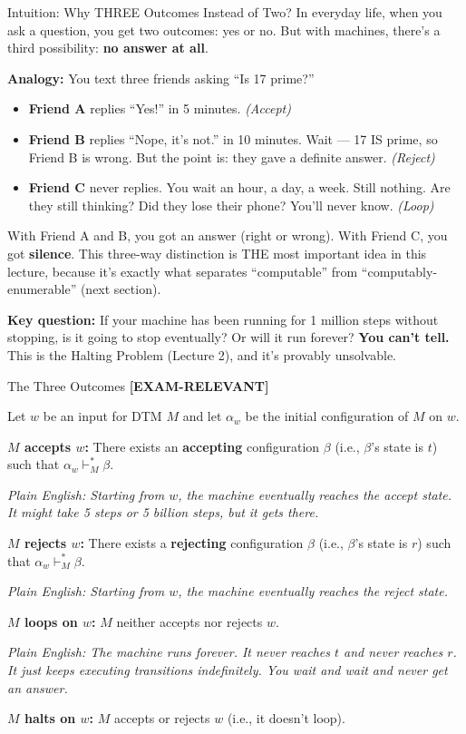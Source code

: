 \documentclass[11pt,a4paper]{article}
\newcommand{\kemark}{\textcolor{red!70!black}{\textbf{[EXAM-RELEVANT]}}}
\begin{document}
\begin{conceptbox}{Intuition: Why THREE Outcomes Instead of Two?}
In everyday life, when you ask a question, you get two outcomes: yes or no. But with machines, there's a third possibility: \textbf{no answer at all}.

\textbf{Analogy:} You text three friends asking ``Is 17 prime?''
\begin{itemize}[nosep]
\item \textbf{Friend A} replies ``Yes!'' in 5 minutes. \textit{(Accept)}
\item \textbf{Friend B} replies ``Nope, it's not.'' in 10 minutes. Wait --- 17 IS prime, so Friend B is wrong. But the point is: they gave a definite answer. \textit{(Reject)}
\item \textbf{Friend C} never replies. You wait an hour, a day, a week. Still nothing. Are they still thinking? Did they lose their phone? You'll never know. \textit{(Loop)}
\end{itemize}

With Friend A and B, you got an answer (right or wrong). With Friend C, you got \textbf{silence}. This three-way distinction is THE most important idea in this lecture, because it's exactly what separates ``computable'' from ``computably-enumerable'' (next section).

\textbf{Key question:} If your machine has been running for 1 million steps without stopping, is it going to stop eventually? Or will it run forever? \textbf{You can't tell.} This is the Halting Problem (Lecture 2), and it's provably unsolvable.
\end{conceptbox}

\begin{definitionbox}{{The Three Outcomes \kemark}}

Let $w$ be an input for DTM $M$ and let $\alpha_w$ be the initial configuration of $M$ on $w$.

\textbf{$M$ accepts $w$:} There exists an \textbf{accepting} configuration $\beta$ (i.e., $\beta$'s state is $t$) such that $\alpha_w \vdash_M^* \beta$.

\textit{Plain English: Starting from $w$, the machine eventually reaches the accept state. It might take 5 steps or 5 billion steps, but it gets there.}

\vspace{0.5em}
\textbf{$M$ rejects $w$:} There exists a \textbf{rejecting} configuration $\beta$ (i.e., $\beta$'s state is $r$) such that $\alpha_w \vdash_M^* \beta$.

\textit{Plain English: Starting from $w$, the machine eventually reaches the reject state.}

\vspace{0.5em}
\textbf{$M$ loops on $w$:} $M$ neither accepts nor rejects $w$.

\textit{Plain English: The machine runs forever. It never reaches $t$ and never reaches $r$. It just keeps executing transitions indefinitely. You wait and wait and never get an answer.}

\vspace{0.5em}
\textbf{$M$ halts on $w$:} $M$ accepts or rejects $w$ (i.e., it doesn't loop).
\end{definitionbox}
\end{document}
